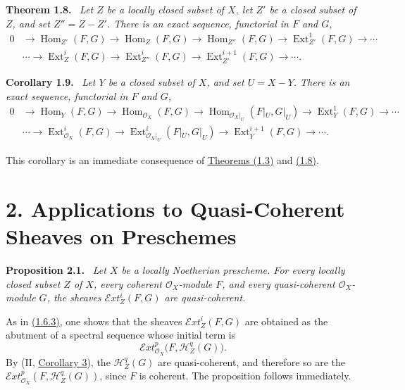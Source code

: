\documentclass[11pt,a4paper,oneside]{book}
\providecommand{\SheafH}{\mathcal H}
\providecommand{\SheafExt}{\mathcal E\!xt}
\providecommand{\OX}{\mathcal O_X}
\providecommand{\Homop}{\operatorname{Hom}}
\providecommand{\Ext}{\operatorname{Ext}}
\newenvironment{sgastatement}[1]
  {\par\addvspace{0.8\baselineskip}\noindent\textbf{#1.}\ \itshape}
  {\par\addvspace{0.35\baselineskip}}
\theoremstyle{plain}
\theoremstyle{definition}
\theoremstyle{remark}
\begin{document}
\begin{sgastatement}{Theorem 1.8}
Let $Z$ be a locally closed subset of $X$, let $Z'$ be a closed subset of
$Z$, and set $Z''=Z-Z'$. There is an exact sequence, functorial in $F$ and
$G$,
\[
\begin{aligned}
 0&\longrightarrow \Homop_{Z'}(F,G)\longrightarrow \Homop_Z(F,G)
 \longrightarrow \Homop_{Z''}(F,G)\longrightarrow \Ext_{Z'}^1(F,G)
 \longrightarrow\cdots \\
 &\cdots\longrightarrow \Ext_Z^i(F,G)\longrightarrow \Ext_{Z''}^i(F,G)
 \longrightarrow \Ext_{Z'}^{i+1}(F,G)\longrightarrow\cdots .
\end{aligned}
\]
\end{sgastatement}

\begin{sgastatement}{Corollary 1.9}
Let $Y$ be a closed subset of $X$, and set $U=X-Y$. There is an exact
sequence, functorial in $F$ and $G$,
\[
\begin{aligned}
 0&\longrightarrow \Homop_Y(F,G)\longrightarrow \Homop_{\OX}(F,G)
 \longrightarrow \Homop_{\OX|_U}(F|_U,G|_U)
 \longrightarrow \Ext_Y^1(F,G)\longrightarrow\cdots \\
 &\cdots\longrightarrow \Ext_{\OX}^i(F,G)
 \longrightarrow \Ext_{\OX|_U}^i(F|_U,G|_U)
 \longrightarrow \Ext_Y^{i+1}(F,G)\longrightarrow\cdots .
\end{aligned}
\]
\end{sgastatement}

This corollary is an immediate consequence of \hyperref[VI.1.3]{Theorems (1.3)} and \hyperref[VI.1.8]{(1.8)}.

\section*{2. Applications to Quasi-Coherent Sheaves on Preschemes}

\begin{sgastatement}{Proposition 2.1}
Let $X$ be a locally Noetherian prescheme. For every locally closed subset
$Z$ of $X$, every coherent $\OX$-module $F$, and every quasi-coherent
$\OX$-module $G$, the sheaves $\SheafExt_Z^i(F,G)$ are quasi-coherent.
\end{sgastatement}

As in \hyperref[VI.1.6.3]{(1.6.3)}, one shows that the sheaves $\SheafExt_Z^i(F,G)$ are obtained
as the abutment of a spectral sequence whose initial term is
\[
 \SheafExt_{\OX}^p\bigl(F,\SheafH_Z^q(G)\bigr).
\]
By \textup{(II, \hyperref[II.3]{Corollary 3})}, the $\SheafH_Z^q(G)$ are quasi-coherent, and
therefore so are the $\SheafExt_{\OX}^p(F,\SheafH_Z^q(G))$, since $F$ is
coherent. The proposition follows immediately.
\end{document}
